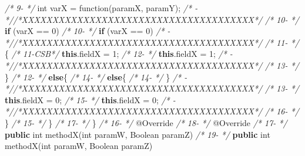 \documentclass[
]{article}
\newenvironment{Shaded}{\begin{snugshade}}{\end{snugshade}}
\newcommand{\AttributeTok}[1]{\textcolor[rgb]{0.77,0.63,0.00}{#1}}
\newcommand{\BuiltInTok}[1]{#1}
\newcommand{\CommentTok}[1]{\textcolor[rgb]{0.56,0.35,0.01}{\textit{#1}}}
\newcommand{\DataTypeTok}[1]{\textcolor[rgb]{0.13,0.29,0.53}{#1}}
\newcommand{\DecValTok}[1]{\textcolor[rgb]{0.00,0.00,0.81}{#1}}
\newcommand{\FunctionTok}[1]{\textcolor[rgb]{0.00,0.00,0.00}{#1}}
\newcommand{\KeywordTok}[1]{\textcolor[rgb]{0.13,0.29,0.53}{\textbf{#1}}}
\newcommand{\NormalTok}[1]{#1}
\begin{document}
\begin{Shaded}
\begin{Highlighting}[]
\CommentTok{/*  9{-}   */}        \DataTypeTok{int}\NormalTok{ varX = }\FunctionTok{function}\NormalTok{(paramX, paramY);             }\CommentTok{/*   {-}   *//*XXXXXXXXXXXXXXXXXXXXXXXXXXXXXXXXXXXXXX*/}               
\CommentTok{/* 10{-}   */}        \KeywordTok{if}\NormalTok{ (varX == }\DecValTok{0}\NormalTok{)                                   }\CommentTok{/* 10{-}   */}        \KeywordTok{if}\NormalTok{ (varX == }\DecValTok{0}\NormalTok{)                                   }
\CommentTok{/*   {-}   *//*XXXXXXXXXXXXXXXXXXXXXXXXXXXXXXXXXXXXXX*/}               \CommentTok{/* 11{-}   */}\NormalTok{        \{                                                }
\CommentTok{/* 11{-}CSB*/}            \KeywordTok{this}\NormalTok{.}\FunctionTok{fieldX}\NormalTok{ = }\DecValTok{1}\NormalTok{;                             }\CommentTok{/* 12{-}   */}            \KeywordTok{this}\NormalTok{.}\FunctionTok{fieldX}\NormalTok{ = }\DecValTok{1}\NormalTok{;                             }
\CommentTok{/*   {-}   *//*XXXXXXXXXXXXXXXXXXXXXXXXXXXXXXXXXXXXXX*/}               \CommentTok{/* 13{-}   */}\NormalTok{        \}                                                            }
\CommentTok{/* 12{-}   */}        \KeywordTok{else}\NormalTok{\{                                            }\CommentTok{/* 14{-}   */}        \KeywordTok{else}\NormalTok{\{                                            }
\CommentTok{/* 14{-}   */}\NormalTok{     \}                                                        }\CommentTok{/*   {-}   *//*XXXXXXXXXXXXXXXXXXXXXXXXXXXXXXXXXXXXXX*/}               
\CommentTok{/* 13{-}   */}            \KeywordTok{this}\NormalTok{.}\FunctionTok{fieldX}\NormalTok{ = }\DecValTok{0}\NormalTok{;                             }\CommentTok{/* 15{-}   */}            \KeywordTok{this}\NormalTok{.}\FunctionTok{fieldX}\NormalTok{ = }\DecValTok{0}\NormalTok{;                             }
\CommentTok{/*   {-}   *//*XXXXXXXXXXXXXXXXXXXXXXXXXXXXXXXXXXXXXX*/}               \CommentTok{/* 16{-}   */}\NormalTok{        \}                                                }
\CommentTok{/* 15{-}   */}\NormalTok{    \}                                                    }\CommentTok{/* 17{-}   */}\NormalTok{    \}                                                    }
\CommentTok{/* 16{-}   */}    \AttributeTok{@Override}                                            \CommentTok{/* 18{-}   */}    \AttributeTok{@Override}                                            
\CommentTok{/* 17{-}   */}    \KeywordTok{public} \DataTypeTok{int} \FunctionTok{methodX}\NormalTok{(}\DataTypeTok{int}\NormalTok{ paramW, }\BuiltInTok{Boolean}\NormalTok{ paramZ)       }\CommentTok{/* 19{-}   */}    \KeywordTok{public} \DataTypeTok{int} \FunctionTok{methodX}\NormalTok{(}\DataTypeTok{int}\NormalTok{ paramW, }\BuiltInTok{Boolean}\NormalTok{ paramZ)       }

\end{Highlighting}
\end{Shaded}
\end{document}
